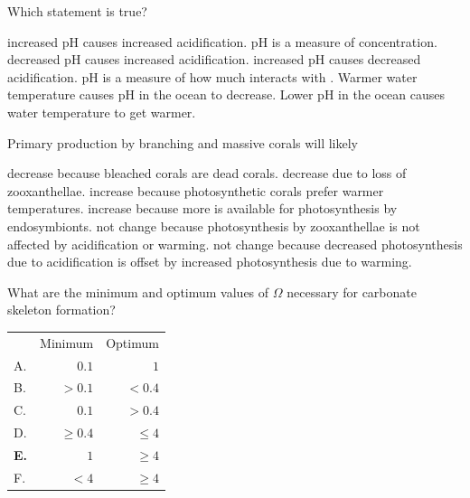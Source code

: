 \question

\begin{choices}
	\choice
	\correctchoice 
\end{choices}


\question
Which statement is true?
\begin{choices}
	\choice increased pH causes increased acidification.
	\correctchoice pH is a measure of  concentration.
	\choice decreased pH causes increased acidification.
	\choice increased pH causes decreased acidification.
	\choice pH is a measure of how much  interacts with .
	\choice Warmer water temperature causes pH in the ocean to decrease.
	\choice Lower pH in the ocean causes water temperature to get warmer.
\end{choices}

\question %
Primary production by branching and massive corals will likely 
\begin{choices}
	\choice decrease because bleached corals are dead corals.
	\correctchoice decrease due to loss of zooxanthellae.
	\choice increase because photosynthetic corals prefer warmer temperatures.
	\choice increase because more  is available for photosynthesis by endosymbionts.
	\choice not change because photosynthesis by zooxanthellae is not affected by acidification or warming.
	\choice not change because decreased photosynthesis due to acidification is offset by increased photosynthesis due to warming.
\end{choices}





\question
What are the minimum and optimum values of $\Omega$ necessary for carbonate skeleton formation? 

\begin{tabular}{lrr}
	& Minimum & Optimum \tabularnewline[\parsep]
	A. & $0.1$ & $1$ \tabularnewline[\parsep]
	B. & $>0.1$ & $< 0.4$ \tabularnewline[\parsep]
	C. & $0.1$ & $>0.4$ \tabularnewline[\parsep]
	D. & $\ge 0.4$ & $\le 4$ \tabularnewline[\parsep]
	\ifprintanswers \textbf{E.} & $1$ & $\ge 4$ \tabularnewline[\parsep]
	F. & $< 4$ & $\ge 4$ \tabularnewline[\parsep]
\end{tabular}

